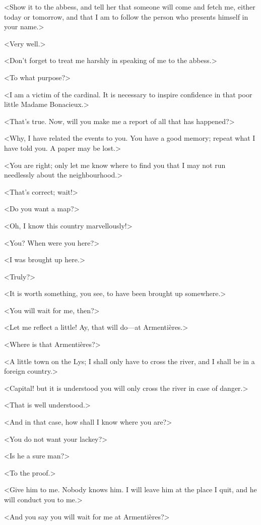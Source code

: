 <Show it to the abbess, and tell her that someone will come and fetch me, either today or tomorrow, and that I am to follow the person who presents himself in your name.> 

<Very well.> 

<Don't forget to treat me harshly in speaking of me to the abbess.> 

<To what purpose?> 

<I am a victim of the cardinal. It is necessary to inspire confidence in that poor little Madame Bonacieux.> 

<That's true. Now, will you make me a report of all that has happened?> 

<Why, I have related the events to you. You have a good memory; repeat what I have told you. A paper may be lost.> 

<You are right; only let me know where to find you that I may not run needlessly about the neighbourhood.> 

<That's correct; wait!> 

<Do you want a map?> 

<Oh, I know this country marvellously!> 

<You? When were you here?> 

<I was brought up here.> 

<Truly?> 

<It is worth something, you see, to have been brought up somewhere.> 

<You will wait for me, then?> 

<Let me reflect a little! Ay, that will do—at Armentières.> 

<Where is that Armentières?> 

<A little town on the Lys; I shall only have to cross the river, and I shall be in a foreign country.> 

<Capital! but it is understood you will only cross the river in case of danger.> 

<That is well understood.> 

<And in that case, how shall I know where you are?> 

<You do not want your lackey?> 

<Is he a sure man?> 

<To the proof.> 

<Give him to me. Nobody knows him. I will leave him at the place I quit, and he will conduct you to me.> 

<And you say you will wait for me at Armentières?> 

